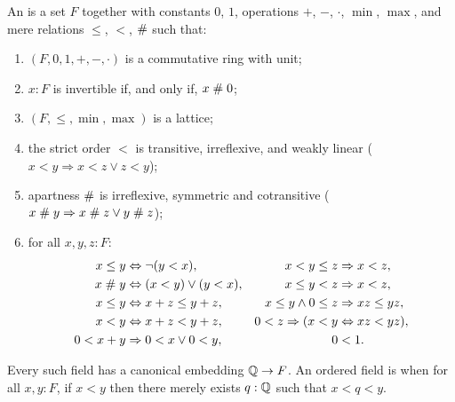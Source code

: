 \begin{defn} \label{ordered-field} An 
  is a set $F$ together with
  constants $0$, $1$, operations $+$, $-$, $\cdot$, $\min$, $\max$, and mere relations
  $\leq$, $<$, $\mathrel{\#}$ such that:
  \begin{enumerate}
  \item $(F, 0, 1, {+}, {-}, {\cdot})$ is a commutative ring with unit;
  \item $x : F$ is invertible if, and only if, $x \mathrel{\#} 0$;
  \item $(F, {\leq}, {\min}, {\max})$ is a lattice;
  \item the strict order $<$ is transitive, irreflexive,
    and weakly linear ($x < y \Rightarrow x < z \lor z < y$);
  \item apartness $\mathrel{\#}$ is irreflexive, symmetric and cotransitive ($x \mathrel{\#} y \Rightarrow x \mathrel{\#} z \lor y \mathrel{\#} z$);
  \item for all $x, y, z : F$:
    \begin{align*}
      x \leq y &\Leftrightarrow \lnot (y < x), &
      x < y \leq z &\Rightarrow x < z, \\
      x \mathrel{\#} y &\Leftrightarrow (x < y) \lor (y < x), &
      x \leq y < z &\Rightarrow x < z, \\
      x \leq y &\Leftrightarrow x + z \leq y + z, &
      x \leq y \land 0 \leq z &\Rightarrow x z \leq y z, \\
      x < y &\Leftrightarrow x + z < y + z, &
      0 < z \Rightarrow (x < y &\Leftrightarrow x z < y z), \\
      0 < x + y &\Rightarrow 0 < x \lor 0 < y, &
      0 &< 1.
    \end{align*}
  \end{enumerate}
  Every such field has a canonical embedding $\mathbb{Q} \to F$. An ordered field is
  when for all $x, y : F$, if $x < y$ then there merely exists $q :
  \mathbb{Q}$ such that $x < q < y$.
\end{defn}

